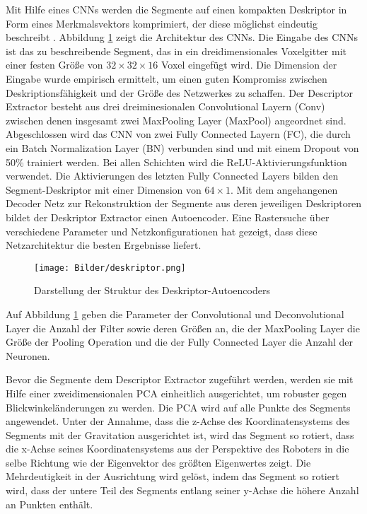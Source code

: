 Mit Hilfe eines CNNs werden die Segmente  auf einen kompakten Deskriptor in Form eines Merkmalsvektors komprimiert, der diese möglichst eindeutig beschreibt \cite{Dube2019}. Abbildung \ref{fig:deskriptor} zeigt die Architektur des CNNs. Die Eingabe des CNNs ist das zu beschreibende Segment, das in ein dreidimensionales Voxelgitter mit einer festen Größe von $ 32 \times 32 \times 16 $ Voxel eingefügt wird. Die Dimension der Eingabe wurde empirisch ermittelt, um einen guten Kompromiss zwischen Deskriptionsfähigkeit und der Größe des Netzwerkes zu schaffen. Der Descriptor Extractor besteht aus drei dreiminesionalen Convolutional Layern (Conv) zwischen denen insgesamt zwei MaxPooling Layer (MaxPool) angeordnet sind. Abgeschlossen wird das CNN von zwei Fully Connected Layern (FC), die durch ein Batch Normalization Layer (BN) verbunden sind und mit einem Dropout von 50\% trainiert werden. Bei allen Schichten wird die ReLU-Aktivierungsfunktion verwendet. Die Aktivierungen des letzten Fully Connected Layers bilden den Segment-Deskriptor mit einer Dimension von $ 64 \times 1 $. Mit dem angehangenen Decoder Netz zur Rekonstruktion der Segmente aus deren jeweiligen Deskriptoren bildet der Deskriptor Extractor einen Autoencoder. Eine Rastersuche über verschiedene Parameter und Netzkonfigurationen hat gezeigt, dass diese Netzarchitektur die besten Ergebnisse liefert. 

\begin{figure}
    \centering
    \texttt{[image: Bilder/deskriptor.png]}
    \caption{Darstellung der Struktur des Deskriptor-Autoencoders \cite{Dube2019}}
    \label{fig:deskriptor}
\end{figure}

Auf Abbildung \ref{fig:deskriptor} geben die Parameter der Convolutional und Deconvolutional Layer die Anzahl der Filter sowie deren Größen an, die der MaxPooling Layer die Größe der Pooling Operation und die der Fully Connected Layer die Anzahl der Neuronen.

Bevor die Segmente dem Descriptor Extractor zugeführt werden, werden sie mit Hilfe einer zweidimensionalen PCA einheitlich ausgerichtet, um robuster gegen Blickwinkeländerungen zu werden. Die PCA wird auf alle Punkte des Segments angewendet. Unter der Annahme, dass die z-Achse des Koordinatensystems des Segments mit der Gravitation ausgerichtet ist, wird das Segment so rotiert, dass die x-Achse seines Koordinatensystems aus der Perspektive des Roboters in die selbe Richtung wie der Eigenvektor des größten Eigenwertes zeigt. Die Mehrdeutigkeit in der Ausrichtung wird gelöst, indem das Segment so rotiert wird, dass der untere Teil des Segments entlang seiner y-Achse die höhere Anzahl an Punkten enthält. 

